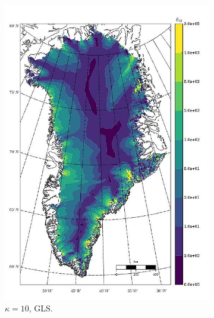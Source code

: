 \begin{figure}
  \begin{subfigure}[b]{0.25\linewidth}
    \includegraphics[width=\linewidth]{images/balance_velocity/greenland/d_U_ob/Ubar_5H_kappa_10_GLS.jpg}
  \caption{$\kappa = 10$, GLS.}
  \label{greenland_bv_image_d_U_ob_kappa_10_GLS}
  \end{subfigure}
  \begin{subfigure}[b]{0.25\linewidth}

\end{subfigure}
\end{figure}
